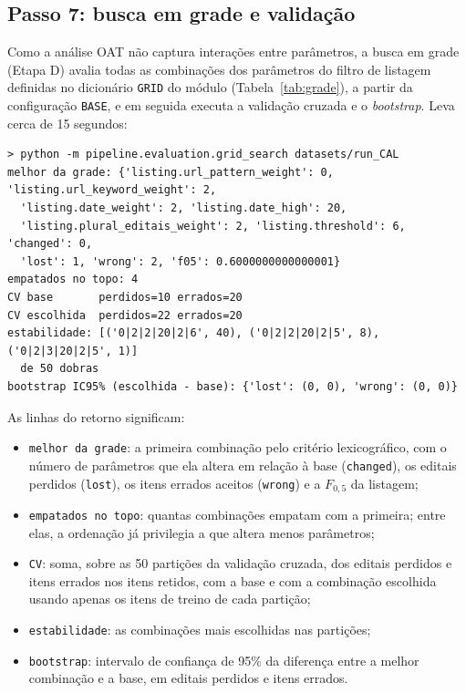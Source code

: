 \subsection{Passo 7: busca em grade e validação}

Como a análise OAT não captura interações entre parâmetros, a busca em grade
(Etapa D) avalia todas as combinações dos parâmetros do filtro de listagem
definidas no dicionário \texttt{GRID} do módulo (Tabela~\ref{tab:grade}), a
partir da configuração \texttt{BASE}, e em seguida executa a validação cruzada
e o \textit{bootstrap}. Leva cerca de 15 segundos:

\begin{footnotesize}
\begin{verbatim}
> python -m pipeline.evaluation.grid_search datasets/run_CAL
melhor da grade: {'listing.url_pattern_weight': 0, 'listing.url_keyword_weight': 2,
  'listing.date_weight': 2, 'listing.date_high': 20,
  'listing.plural_editais_weight': 2, 'listing.threshold': 6, 'changed': 0,
  'lost': 1, 'wrong': 2, 'f05': 0.6000000000000001}
empatados no topo: 4
CV base       perdidos=10 errados=20
CV escolhida  perdidos=22 errados=20
estabilidade: [('0|2|2|20|2|6', 40), ('0|2|2|20|2|5', 8), ('0|2|3|20|2|5', 1)]
  de 50 dobras
bootstrap IC95% (escolhida - base): {'lost': (0, 0), 'wrong': (0, 0)}
\end{verbatim}
\end{footnotesize}

As linhas do retorno significam:

\begin{itemize}
  \item \texttt{melhor da grade}: a primeira combinação pelo critério
    lexicográfico, com o número de parâmetros que ela altera em relação à base
    (\texttt{changed}), os editais perdidos (\texttt{lost}), os itens errados
    aceitos (\texttt{wrong}) e a $F_{0{,}5}$ da listagem;
  \item \texttt{empatados no topo}: quantas combinações empatam com a
    primeira; entre elas, a ordenação já privilegia a que altera menos
    parâmetros;
  \item \texttt{CV}: soma, sobre as 50 partições da validação cruzada, dos
    editais perdidos e itens errados nos itens retidos, com a base e com a
    combinação escolhida usando apenas os itens de treino de cada partição;
  \item \texttt{estabilidade}: as combinações mais escolhidas nas partições;
  \item \texttt{bootstrap}: intervalo de confiança de 95\% da diferença entre
    a melhor combinação e a base, em editais perdidos e itens errados.
\end{itemize}

